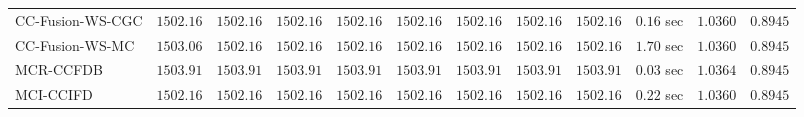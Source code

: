 \begin{table}[H]
\begin{tabular}{lrrrrrrrrrrr}
    CC-Fusion-WS-CGC & $      1502.16$ & $      1502.16$ & $      1502.16$ & $      1502.16$ & $      1502.16$ & $      1502.16$ & $      1502.16$ & $      1502.16$ & $         0.16$ sec    & $       1.0360$  & $       0.8945$ \\ 
     CC-Fusion-WS-MC & $      1503.06$ & $      1502.16$ & $      1502.16$ & $      1502.16$ & $      1502.16$ & $      1502.16$ & $      1502.16$ & $      1502.16$ & $         1.70$ sec    & $       1.0360$  & $       0.8945$ \\ 
\cmidrule{1-1} 
           MCR-CCFDB & $      1503.91$ & $      1503.91$ & $      1503.91$ & $      1503.91$ & $      1503.91$ & $      1503.91$ & $      1503.91$ & $      1503.91$ & $         0.03$ sec    & $       1.0364$  & $       0.8945$ \\ 
\cmidrule{1-1} 
           MCI-CCIFD & $      1502.16$ & $      1502.16$ & $      1502.16$ & $      1502.16$ & $      1502.16$ & $      1502.16$ & $      1502.16$ & $      1502.16$ & $         0.22$ sec    & $       1.0360$  & $       0.8945$ \\ 
\bottomrule
\end{tabular}
\end{table}

